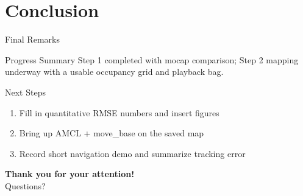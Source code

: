 \documentclass[10pt]{beamer}
\begin{document}
\section{Conclusion}

\begin{frame}{Final Remarks}
\begin{block}{Progress Summary}
Step 1 completed with mocap comparison; Step 2 mapping underway with a usable occupancy grid and playback bag.
\end{block}

\begin{block}{Next Steps}
\begin{enumerate}
    \item Fill in quantitative RMSE numbers and insert figures
    \item Bring up AMCL + move\_base on the saved map
    \item Record short navigation demo and summarize tracking error
\end{enumerate}
\end{block}

\begin{center}
\Large \textbf{Thank you for your attention!} \\
\vspace{0.5cm}
\normalsize Questions?
\end{center}
\end{frame}
\end{document}
